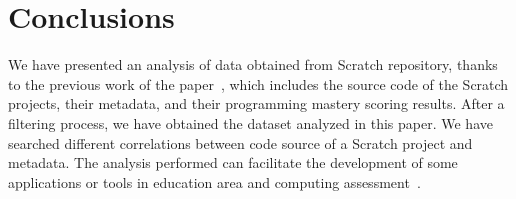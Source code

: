 \documentclass[a4paper,twocolumn,10pt]{article}
\begin{document}
\section{Conclusions}
\label{sec:conclusions}

We have presented an analysis of data obtained from Scratch repository, thanks
to the previous work of the paper~\cite{aivaloglou2017dataset}, which includes the source code of the Scratch
projects, their metadata, and their programming mastery scoring results.
After a filtering process, we have obtained the dataset analyzed in this paper. We
have searched different correlations between code source of a Scratch project and metadata.
The analysis performed can facilitate the development of some applications or tools
in education area and computing assessment~\cite{robles2018ontools}.


 

\end{document}
